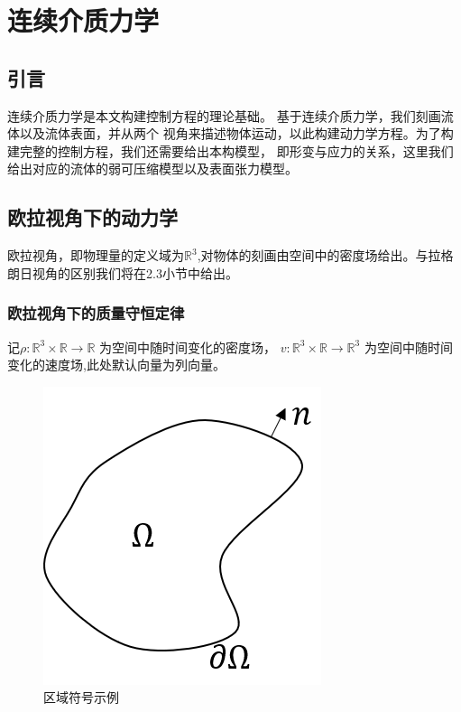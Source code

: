 \chapter{连续介质力学} \label{chap2}
\section{引言}
连续介质力学是本文构建控制方程的理论基础。
基于连续介质力学，我们刻画流体以及流体表面，并从两个
视角来描述物体运动，以此构建动力学方程。为了构建完整的控制方程，我们还需要给出本构模型，
即形变与应力的关系，这里我们给出对应的流体的弱可压缩模型以及表面张力模型。

\section{欧拉视角下的动力学}
欧拉视角，即物理量的定义域为$\mathbb{R}^3$,对物体的刻画由空间中的密度场给出。与拉格朗日视角的区别我们将在2.3小节中给出。

\subsection{欧拉视角下的质量守恒定律}
记$\rho : \mathbb{R}^3 \times \mathbb{R} \rightarrow \mathbb{R}$ 为空间中随时间变化的密度场，
$v : \mathbb{R}^3 \times \mathbb{R} \rightarrow \mathbb{R}^3$ 为空间中随时间变化的速度场,此处默认向量为列向量。
\begin{figure}[htbp]
    \centering
    \includegraphics[scale=0.5]{./images/image1.png}
    \caption{区域符号示例}
    \label{fig:domain}
\end{figure}

